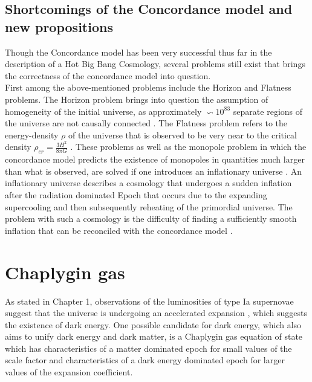 \documentclass[a4paper, 11pt]{FSKH_623_Report}
\numberwithin{equation}{section}
\begin{document}
\section{Shortcomings of the Concordance model and new propositions}
Though the Concordance model has been very successful thus far in the description of a Hot Big Bang Cosmology, several problems still exist that brings the correctness of the concordance model into question. \\
First among the above-mentioned problems include the Horizon and Flatness problems. The Horizon problem brings into question the assumption of homogeneity of the initial universe, as approximately $\backsim 10^{83}$ separate regions of the universe are not causally connected \citep{IU}. The Flatness problem refers to the   energy-density $\rho$ of the universe that is observed to be very near to the critical density $\rho_{cr}=\frac{3H^{2}}{8\pi G}$ \citep{GRES, IU}. These problems as well as the monopole problem in which the concordance model predicts the existence of monopoles in quantities much larger than what is observed, are solved if one introduces an inflationary universe \citep{IU}. An inflationary universe describes a cosmology that undergoes a sudden inflation after the radiation dominated Epoch that occurs due to the expanding supercooling and then subsequently reheating of the primordial universe. The problem with such a cosmology is the difficulty of finding a sufficiently smooth inflation that can be reconciled with the concordance model \citep{IU}.\\

\chapter{Chaplygin gas}
As stated in Chapter 1, observations of the luminosities of type Ia supernovae suggest that the universe is undergoing an accelerated expansion \citep{NPSNe, RMCGAU}, which suggests the existence of dark energy. One possible candidate for dark energy, which also aims to unify dark energy and dark matter, is a Chaplygin gas equation of state which has characteristics of a matter dominated epoch for small values of the scale factor and characteristics of a dark energy dominated epoch for larger values of the expansion coefficient.
\end{document}
